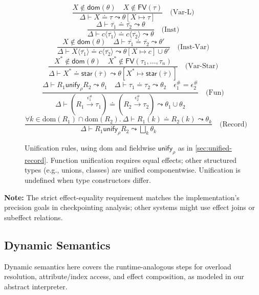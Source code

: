 \begin{figure*}[t]
\centering
\[
\frac{X \notin \mathsf{dom}(\theta) \quad X \notin \mathsf{FV}(\tau)}
     {\Delta \vdash X \doteq \tau \leadsto \theta[X \mapsto \tau]} \quad \text{(Var-L)}
\]
\[
\frac{\Delta \vdash \overline{\tau_1} \doteq \overline{\tau_2} \leadsto \theta}
     {\Delta \vdash c\langle\overline{\tau_1}\rangle \doteq c\langle\overline{\tau_2}\rangle \leadsto \theta} \quad \text{(Inst)}
\]
\[
\frac{X \notin \mathsf{dom}(\theta) \quad \Delta \vdash \overline{\tau_1} \doteq \overline{\tau_2} \leadsto \theta'}
     {\Delta \vdash X\langle\overline{\tau_1}\rangle \doteq c\langle\overline{\tau_2}\rangle \leadsto \theta[X \mapsto c] \cup \theta'} \quad \text{(Inst-Var)}
\]
\[
\frac{X^* \notin \mathsf{dom}(\theta) \quad X^* \notin \mathsf{FV}(\tau_1, \ldots, \tau_n)}
     {\Delta \vdash X^* \doteq \mathsf{star}(\overline{\tau}) \leadsto \theta[X^* \mapsto \mathsf{star}(\overline{\tau})]} \quad \text{(Var-Star)}
\]
\[
\frac{\Delta \vdash R_1 \mathrel{\mathsf{unify}_{\rho}} R_2 \leadsto \theta_1 \quad \Delta \vdash \tau_1 \doteq \tau_2 \leadsto \theta_2 \quad \epsilon^\#_1 = \epsilon^\#_2}
     {\Delta \vdash (R_1 \xrightarrow{\epsilon^\#_1} \tau_1) \doteq (R_2 \xrightarrow{\epsilon^\#_2} \tau_2) \leadsto \theta_1 \cup \theta_2} \quad \text{(Fun)}
\]
\[
\frac{\forall k \in \mathrm{dom}(R_1) \cap \mathrm{dom}(R_2).\ \Delta \vdash R_1(k) \doteq R_2(k) \leadsto \theta_k}
     {\Delta \vdash R_1 \mathrel{\mathsf{unify}_{\rho}} R_2 \leadsto \bigsqcup_k \theta_k} \quad \text{(Record)}
\]
\caption{Unification rules, using $\mathrm{dom}$ and fieldwise $\mathsf{unify}_{\rho}$ as in \autoref{sec:unified-record}. Function unification requires equal effects; other structured types (e.g., unions, classes) are unified componentwise. Unification is undefined when type constructors differ.}
\label{fig:unification}
\end{figure*}

\noindent\textbf{Note:} The strict effect-equality requirement matches the implementation’s precision goals in checkpointing analysis; other systems might use effect joins or subeffect relations.

\subsection{Dynamic Semantics}

Dynamic semantics here covers the runtime-analogous steps for overload resolution, attribute/index access, and effect composition, as modeled in our abstract interpreter.

